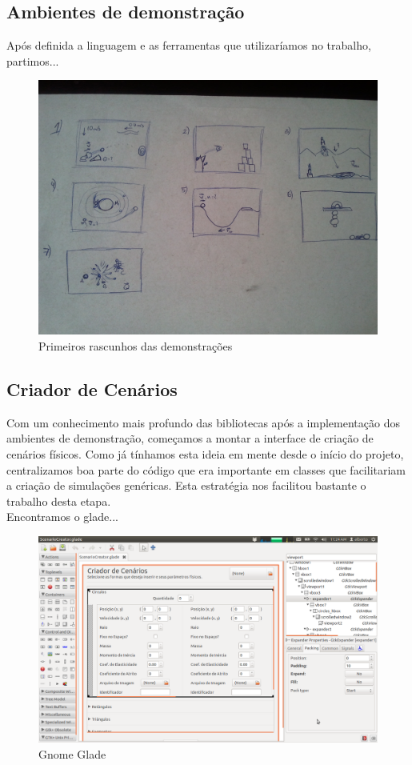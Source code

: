\subsection{Ambientes de demonstração}
Após definida a linguagem e as ferramentas que utilizaríamos no trabalho, partimos...

\begin{figure}[H]
	\centering
	\caption{Primeiros rascunhos das demonstrações}
	\includegraphics[scale=0.2]{images/tcc-demos.jpg}
	\hspace{0.5cm}
\end{figure}

\subsection{Criador de Cenários}
Com um conhecimento mais profundo das bibliotecas após a implementação dos ambientes de demonstração, começamos a montar a interface de criação de cenários físicos. Como já tínhamos esta ideia em mente desde o início do projeto, centralizamos boa parte do código que era importante em classes que facilitariam a criação de simulações genéricas. Esta estratégia nos facilitou bastante o trabalho desta etapa.\\

Encontramos o glade...

\begin{figure}[H]
	\centering
	\caption{Gnome Glade}
	\includegraphics[scale=0.3]{images/glade.png}
	\hspace{0.5cm}
\end{figure}


